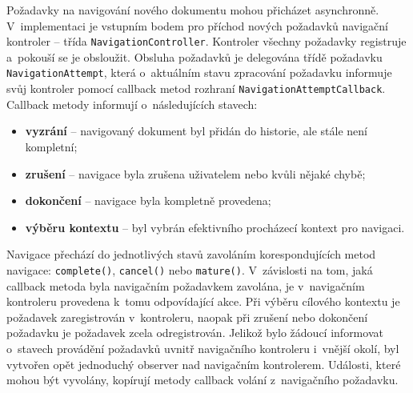 Požadavky na navigování nového dokumentu mohou přicházet asynchronně. V~implementaci je vstupním bodem pro příchod nových požadavků navigační kontroler -- třída \texttt{NavigationController}. Kontroler všechny požadavky registruje a~pokouší se je obsloužit. Obsluha požadavků je delegována třídě požadavku \texttt{NavigationAttempt}, která o~aktuálním stavu zpracování požadavku informuje svůj kontroler pomocí callback metod rozhraní \texttt{NavigationAttemptCallback}. Callback metody informují o~následujících stavech:

\begin{itemize}
  \item \textbf{vyzrání} -- navigovaný dokument byl přidán do historie, ale stále není kompletní;
  \item \textbf{zrušení} -- navigace byla zrušena uživatelem nebo kvůli nějaké chybě;
  \item \textbf{dokončení} -- navigace byla kompletně provedena; 
  \item \textbf{výběru kontextu} -- byl vybrán efektivního procházecí kontext pro navigaci.
\end{itemize}

Navigace přechází do jednotlivých stavů zavoláním korespondujících metod navigace: \texttt{complete()}, \texttt{cancel()} nebo \texttt{mature()}. V~závislosti na tom, jaká callback metoda byla navigačním požadavkem zavolána, je v~navigačním kontroleru provedena k~tomu odpovídající akce. Při výběru cílového kontextu je požadavek zaregistrován v~kontroleru, naopak při zrušení nebo dokončení požadavku je požadavek zcela odregistrován. Jelikož bylo žádoucí informovat o~stavech provádění požadavků uvnitř navigačního kontroleru i~vnější okolí, byl vytvořen opět jednoduchý observer nad navigačním kontrolerem. Události, které mohou být vyvolány, kopírují metody callback volání z~navigačního požadavku. 

